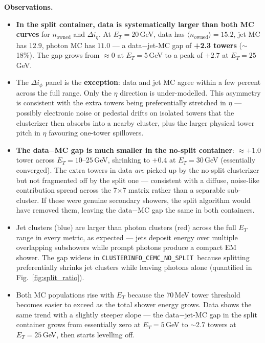 \documentclass[11pt,a4paper]{article}
\newcommand{\nosplitnode}{\texttt{CLUSTERINFO\_CEMC\_NO\_SPLIT}}
\begin{document}
\textbf{Observations.}
\begin{itemize}
\item \textbf{In the split container, data is systematically larger than
  both MC curves} for $n_{\mathrm{owned}}$ and $\Delta i_\eta$.  At
  $E_T = 20$\,GeV, data has $\langle n_{\mathrm{owned}}\rangle = 15.2$,
  jet MC has $12.9$, photon MC has $11.0$ --- a data$-$jet-MC gap of
  \textbf{+2.3 towers} ($\sim$18\%).  The gap grows from
  $\approx 0$ at $E_T = 5$\,GeV to a peak of $+2.7$ at $E_T = 25$\,GeV.
\item The $\Delta i_\phi$ panel is the \textbf{exception}: data and jet MC
  agree within a few percent across the full range.  Only the $\eta$
  direction is under-modelled.  This asymmetry is consistent with the
  extra towers being preferentially stretched in $\eta$ --- possibly
  electronic noise or pedestal drifts on isolated towers that the
  clusterizer then absorbs into a nearby cluster, plus the larger
  physical tower pitch in $\eta$ favouring one-tower spillovers.
\item \textbf{The data$-$MC gap is much smaller in the no-split container}:
  $\approx +1.0$ tower across $E_T = 10$--$25$\,GeV, shrinking to $+0.4$
  at $E_T = 30$\,GeV (essentially converged).  The extra towers in data
  \emph{are} picked up by the no-split clusterizer but not fragmented
  off by the split one --- consistent with a diffuse, noise-like
  contribution spread across the 7$\times$7 matrix rather than a
  separable sub-cluster.  If these were genuine secondary showers, the
  split algorithm would have removed them, leaving the data$-$MC gap
  the same in both containers.
\item Jet clusters (blue) are larger than photon clusters (red) across the
  full $E_T$ range in every metric, as expected --- jets deposit energy over
  multiple overlapping subshowers while prompt photons produce a compact
  EM shower.  The gap widens in \nosplitnode\ because splitting preferentially
  shrinks jet clusters while leaving photons alone (quantified in
  Fig.~\ref{fig:split_ratio}).
\item Both MC populations rise with $E_T$ because the 70\,MeV tower
  threshold becomes easier to exceed as the total shower energy grows.
  Data shows the same trend with a slightly steeper slope --- the
  data$-$jet-MC gap in the split container grows from essentially zero at
  $E_T = 5$\,GeV to $\sim$2.7 towers at $E_T = 25$\,GeV, then starts
  levelling off.
\end{itemize}
\end{document}
